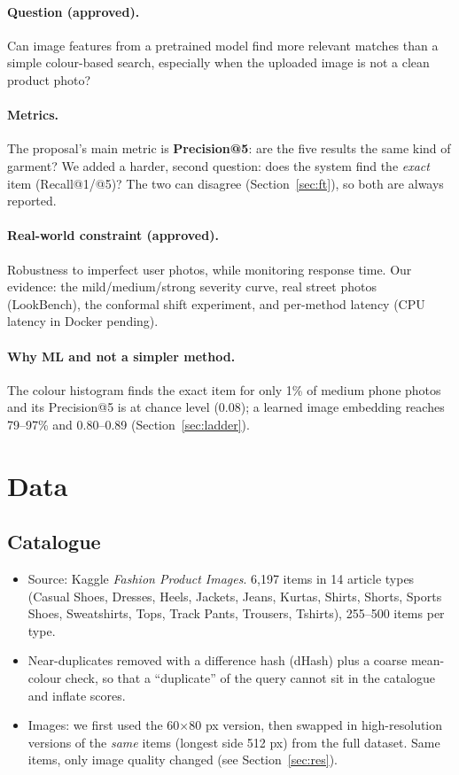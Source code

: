 \documentclass[11pt,a4paper]{article}
\begin{document}
\paragraph{Question (approved).} Can image features from a pretrained model find more relevant matches than
a simple colour-based search, especially when the uploaded image is not a clean product photo?

\paragraph{Metrics.} The proposal's main metric is \textbf{Precision@5}: are the five results the same kind
of garment? We added a harder, second question: does the system find the \emph{exact} item
(Recall@1/@5)? The two can disagree (Section~\ref{sec:ft}), so both are always reported.

\paragraph{Real-world constraint (approved).} Robustness to imperfect user photos, while monitoring
response time. Our evidence: the mild/medium/strong severity curve, real street photos (LookBench), the
conformal shift experiment, and per-method latency (CPU latency in Docker pending).

\paragraph{Why ML and not a simpler method.} The colour histogram finds the exact item for only 1\% of
medium phone photos and its Precision@5 is at chance level (0.08); a learned image embedding reaches
79--97\% and 0.80--0.89 (Section~\ref{sec:ladder}).

\section{Data}

\subsection{Catalogue}
\begin{itemize}
  \item Source: Kaggle \emph{Fashion Product Images}. 6,197 items in 14 article types
        (Casual Shoes, Dresses, Heels, Jackets, Jeans, Kurtas, Shirts, Shorts, Sports Shoes,
        Sweatshirts, Tops, Track Pants, Trousers, Tshirts), 255--500 items per type.
  \item Near-duplicates removed with a difference hash (dHash) plus a coarse mean-colour check,
        so that a ``duplicate'' of the query cannot sit in the catalogue and inflate scores.
  \item Images: we first used the 60$\times$80 px version, then swapped in high-resolution
        versions of the \emph{same} items (longest side 512 px) from the full dataset. Same items,
        only image quality changed (see Section~\ref{sec:res}).
\end{itemize}
\end{document}

